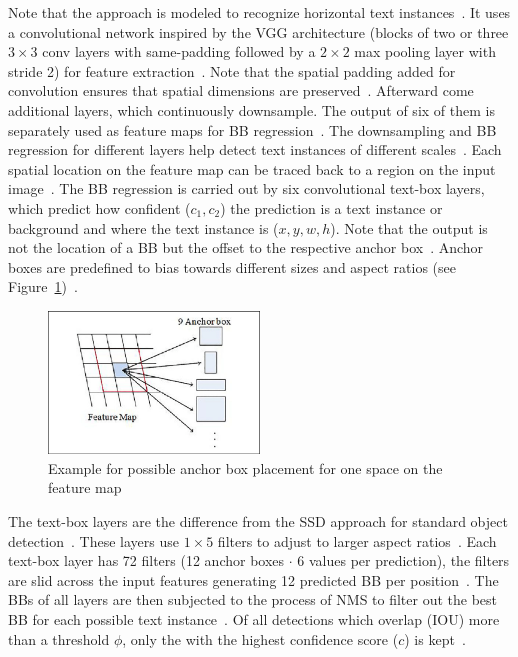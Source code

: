 Note that the approach is modeled to recognize horizontal text instances~\citep{liao_textboxes_2017}.
It uses a convolutional network inspired by the VGG architecture (blocks of two or
three $3\times3$ conv layers with same-padding followed by a $2\times2$ max pooling layer with
stride 2) for feature extraction~\citep{liao_textboxes_2017,simonyan_very_2015}.
Note that the spatial padding added for convolution ensures that spatial dimensions are
preserved~\citep{simonyan_very_2015}.
Afterward come additional layers, which continuously downsample.
The output of six of them is separately used as feature maps for \ac{BB}
regression~\citep{liao_textboxes_2017}.
The downsampling and \ac{BB} regression for different layers help detect text instances of different
scales~\citep{liu_ssd_2016}.
Each spatial location on the feature map can be traced back to a region on the input
image~\citep{long_scene_2021}.
The \ac{BB} regression is carried out by six convolutional text-box layers, which predict how
confident ($c_1,c_2$) the prediction is a text instance or background and where the text instance
is ($x,y,w,h$).
Note that the output is not the location of a \ac{BB} but the offset to the
respective anchor box~\citep{liao_textboxes_2017,long_scene_2021}.
Anchor boxes are predefined to bias towards different sizes and aspect ratios (see
Figure~\ref{fig:STD-segfree-anchors})~\citep{liao_textboxes_2017}.
\begin{figure}[ht]
    \centering
    \includegraphics[width=0.5\textwidth]{img/STD-seg-free-anchor-boxes-Zhao-Novel-2018.png}
    \caption[Anchor box placement for one space on the feature map]{%
        Example for possible anchor box placement for one space on the feature
        map~\citep{zhao_novel_2018}\label{fig:STD-segfree-anchors}
    }
\end{figure}
The text-box layers are the difference from the \ac{SSD} approach for standard object
detection~\citep{liao_textboxes_2017,liu_ssd_2016}.
These layers use $1\times5$ filters to adjust to larger aspect ratios~\citep{liao_textboxes_2017}.
Each text-box layer has 72 filters (12 anchor boxes $\cdot$ 6 values per prediction), the filters
are slid across the input features generating 12 predicted \ac{BB} per
position~\citep{liao_textboxes_2017}.
The \acp{BB} of all layers are then subjected to the process of \ac{NMS} to filter out the best
\ac{BB} for each possible text instance~\citep{liao_textboxes_2017}.
Of all detections which overlap (\ac{IOU}) more than a threshold
$\phi$, only the with the highest confidence score ($c$) is kept~\citep{hosang_learning_2017}.


